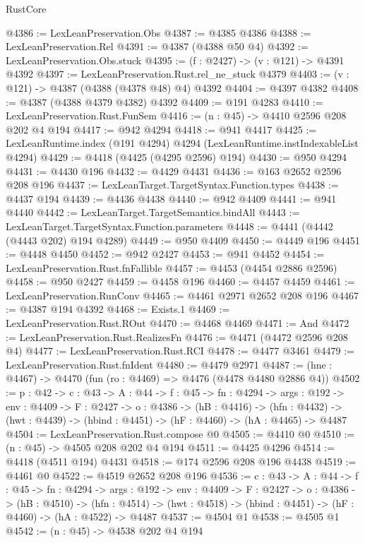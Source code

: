 \begin{lexlean}{RustCore}
\begin{coremodule}
@4386 := LexLeanPreservation.Obs
@4387 := @4385 @4386
@4388 := LexLeanPreservation.Rel
@4391 := @4387 (@4388 @50 @4)
@4392 := LexLeanPreservation.Obs.stuck
@4395 := (f : @2427) -> (v : @121) -> @4391 @4392
@4397 := LexLeanPreservation.Rust.rel_ne_stuck @4379
@4403 := (v : @121) -> @4387 (@4388 (@4378 @48) @4) @4392
@4404 := @4397 @4382
@4408 := @4387 (@4388 @4379 @4382) @4392
@4409 := @191 @4283
@4410 := LexLeanPreservation.Rust.FunSem
@4416 := (n : @45) -> @4410 @2596 @208 @202 @4 @194
@4417 := @942 @4294
@4418 := @941 @4417
@4425 := LexLeanRuntime.index (@191 @4294) @4294 (LexLeanRuntime.instIndexableList @4294)
@4429 := @4418 (@4425 (@4295 @2596) @194)
@4430 := @950 @4294
@4431 := @4430 @196
@4432 := @4429 @4431
@4436 := @163 @2652 @2596 @208 @196
@4437 := LexLeanTarget.TargetSyntax.Function.types
@4438 := @4437 @194
@4439 := @4436 @4438
@4440 := @942 @4409
@4441 := @941 @4440
@4442 := LexLeanTarget.TargetSemantics.bindAll
@4443 := LexLeanTarget.TargetSyntax.Function.parameters
@4448 := @4441 (@4442 (@4443 @202) @194 @4289)
@4449 := @950 @4409
@4450 := @4449 @196
@4451 := @4448 @4450
@4452 := @942 @2427
@4453 := @941 @4452
@4454 := LexLeanPreservation.Rust.fnFallible
@4457 := @4453 (@4454 @2886 @2596)
@4458 := @950 @2427
@4459 := @4458 @196
@4460 := @4457 @4459
@4461 := LexLeanPreservation.RunConv
@4465 := @4461 @2971 @2652 @208 @196
@4467 := @4387 @194 @4392
@4468 := Exists.{1}
@4469 := LexLeanPreservation.Rust.ROut
@4470 := @4468 @4469
@4471 := And
@4472 := LexLeanPreservation.Rust.RealizesFn
@4476 := @4471 (@4472 @2596 @208 @4)
@4477 := LexLeanPreservation.Rust.RCI
@4478 := @4477 @3461
@4479 := LexLeanPreservation.Rust.fnIdent
@4480 := @4479 @2971
@4487 := (hne : @4467) -> @4470 (fun (ro : @4469) => @4476 (@4478 @4480 @2886 @4))
@4502 := {p : @42} ->
  {c : @43} ->
  {A : @44} ->
  {f : @45} ->
  {fn : @4294} ->
  {args : @192} ->
  {env : @4409} ->
  {F : @2427} ->
  {o : @4386} ->
  (hB : @4416) ->
  (hfn : @4432) -> (hwt : @4439) -> (hbind : @4451) -> (hF : @4460) -> (hA : @4465) -> @4487
@4504 := LexLeanPreservation.Rust.compose @0
@4505 := @4410 @0
@4510 := (n : @45) -> @4505 @208 @202 @4 @194
@4511 := @4425 @4296
@4514 := @4418 (@4511 @194) @4431
@4518 := @174 @2596 @208 @196 @4438
@4519 := @4461 @0
@4522 := @4519 @2652 @208 @196
@4536 := {c : @43} ->
  {A : @44} ->
  {f : @45} ->
  {fn : @4294} ->
  {args : @192} ->
  {env : @4409} ->
  {F : @2427} ->
  {o : @4386} ->
  (hB : @4510) ->
  (hfn : @4514) -> (hwt : @4518) -> (hbind : @4451) -> (hF : @4460) -> (hA : @4522) -> @4487
@4537 := @4504 @1
@4538 := @4505 @1
@4542 := (n : @45) -> @4538 @202 @4 @194

\end{coremodule}
\end{lexlean}
